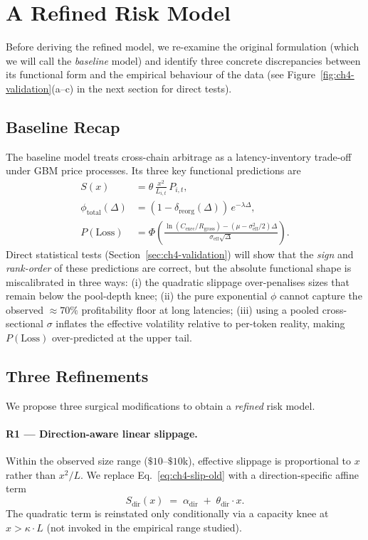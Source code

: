 \documentclass[11pt,a4paper]{article}
\newcommand{\Cexec}{C_{\text{exec}}}
\newcommand{\Rgross}{R_{\text{gross}}}
\begin{document}
\section{A Refined Risk Model}
\label{sec:ch4-refined-model}

Before deriving the refined model, we re-examine the original formulation
(which we will call the \textit{baseline} model) and identify three
concrete discrepancies between its functional form and the empirical
behaviour of the data (see Figure~\ref{fig:ch4-validation}(a--c) in the
next section for direct tests).

\subsection{Baseline Recap}

The baseline model treats cross-chain arbitrage as a latency-inventory
trade-off under GBM price processes. Its three key functional
predictions are
\begin{align}
    \label{eq:ch4-slip-old}
    S(x) &= \theta\,\frac{x^{2}}{L_{i,t}}\,P_{i,t}, \\
    \label{eq:ch4-phi-old}
    \phi_{\text{total}}(\Delta) &= (1-\delta_{\text{reorg}}(\Delta))\,
        e^{-\lambda\Delta}, \\
    \label{eq:ch4-ploss-old}
    P(\text{Loss}) &= \Phi\!\left(\frac{\ln(\Cexec/\Rgross) -
        (\mu - \sigma_{\text{eff}}^{2}/2)\Delta}
        {\sigma_{\text{eff}}\sqrt{\Delta}}\right).
\end{align}
Direct statistical tests (Section~\ref{sec:ch4-validation}) will show that
the \emph{sign} and \emph{rank-order} of these predictions are correct,
but the absolute functional shape is miscalibrated in three ways: (i) the
quadratic slippage over-penalises sizes that remain below the pool-depth
knee; (ii) the pure exponential $\phi$ cannot capture the observed $\approx
70\%$ profitability floor at long latencies; (iii) using a pooled
cross-sectional $\sigma$ inflates the effective volatility relative to
per-token reality, making $P(\text{Loss})$ over-predicted at the upper
tail.

\subsection{Three Refinements}

We propose three surgical modifications to obtain a \textit{refined} risk
model.

\paragraph{R1 --- Direction-aware linear slippage.} Within the observed
size range ($\$10$--$\$10$k), effective slippage is proportional to $x$
rather than $x^{2}/L$. We replace Eq.~\eqref{eq:ch4-slip-old} with a
direction-specific affine term
\begin{equation}
\label{eq:ch4-slip-new}
    S_{\text{dir}}(x) \;=\; \alpha_{\text{dir}} \;+\; \theta_{\text{dir}}\cdot x.
\end{equation}
The quadratic term is reinstated only conditionally via a capacity knee at
$x > \kappa\cdot L$ (not invoked in the empirical range studied).
\end{document}
